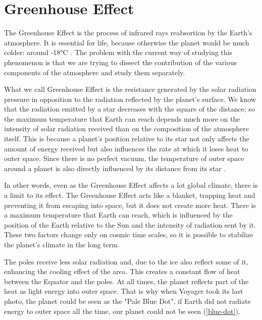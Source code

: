 \chapter[Greenhouse Effect]{Greenhouse Effect}

The Greenhouse Effect is the process of infrared rays reabsortion by the Earth's atmosphere. It is essential for life, because otherwise the planet would be much colder: around -18°C \cite{Nasa-cold}. The problem with the current way of studying this phenomenon is that we are trying to dissect the contribution of the various components of the atmosphere and study them separately.

What we call Greenhouse Effect is the resistance generated by the solar radiation pressure in opposition to the radiation reflected by the planet's surface. We know that the radiation emitted by a star decreases with the square of the distance; so the maximum temperature that Earth can reach depends much more on the intensity of solar radiation received than on the composition of the atmosphere itself. This is because a planet's position relative to its star not only affects the amount of energy received but also influences the rate at which it loses heat to outer space. Since there is no perfect vacuum, the temperature of outer space around a planet is also directly influenced by its distance from its star \cite{Cosmic-wave}.

In other words, even as the Greenhouse Effect affects a lot global climate, there is a limit to its effect. The Greenhouse Effect acts like a blanket, trapping heat and preventing it from escaping into space, but it does not create more heat.  There is a maximum temperature that Earth can reach, which is influenced by the position of the Earth relative to the Sun and the intensity of radiation sent by it. These two factors change only on cosmic time scales, so it is possible to stabilize the planet's climate in the long term.

The poles receive less solar radiation and, due to the ice also reflect some of it, enhancing the cooling effect of the area. This creates a constant flow of heat between the Equator and the poles. At all times, the planet reflects part of the heat as light energy into outer space. That is why when Voyager took its last photo, the planet could be seen as the "Pale Blue Dot", if Earth did not radiate energy to outer space all the time, our planet could not be seen (\autoref{blue-dot}).

